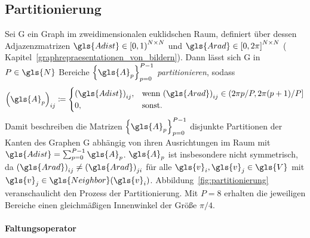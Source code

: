 \subsection{Partitionierung}
\label{partitionierung}



Sei \gls{G} ein Graph im zweidimensionalen euklidschen Raum, definiert über dessen Adjazenzmatrizen $\gls{Adist} \in {\left[0, 1\right)}^{N \times N}$ und $\gls{Arad} \in {\left[0, 2\pi\right]}^{N \times N}$ (\vgl{} Kapitel~\ref{graphrepraesentationen_von_bildern}).
Dann lässt sich \gls{G} in $P \in \gls{N}$ Bereiche ${\left\{\gls{A}_p\right\}}_{p=0}^{P-1}$ \emph{partitionieren}, sodass
\begin{equation*}
  {\left(\gls{A}_p\right)}_{ij} \coloneqq \begin{cases}
    {\left(\gls{Adist}\right)}_{ij}, & \text{wenn } {\left(\gls{Arad}\right)}_{ij} \in \left(2\pi p/P, 2\pi\left(p+1\right)/P\right]\\
    0, & \text{sonst.}
  \end{cases}
\end{equation*}
Damit beschreiben die Matrizen ${\left\{\gls{A}_p\right\}}_{p=0}^{P-1}$ disjunkte Partitionen der Kanten des Graphen \gls{G} abhängig von ihren Ausrichtungen im Raum mit $\gls{Adist} = \sum_{p=0}^{P-1} \gls{A}_p$.
$\gls{A}_p$ ist insbesondere nicht symmetrisch, da ${\left(\gls{Arad}\right)}_{ij} \neq {\left(\gls{Arad}\right)}_{ji}$ für alle $\gls{v}_i, \gls{v}_j \in \gls{V}$ mit $\gls{v}_j \in \gls{Neighbor}\left(\gls{v}_i\right)$.
Abbildung~\ref{fig:partitionierung} veranschaulicht den Prozess der Partitionierung.
Mit $P = 8$ erhalten die jeweiligen Bereiche \zB{} einen gleichmäßigen Innenwinkel der Größe $\pi/4$.

\paragraph{Faltungsoperator}
\label{partitionierung_faltungsoperator}

